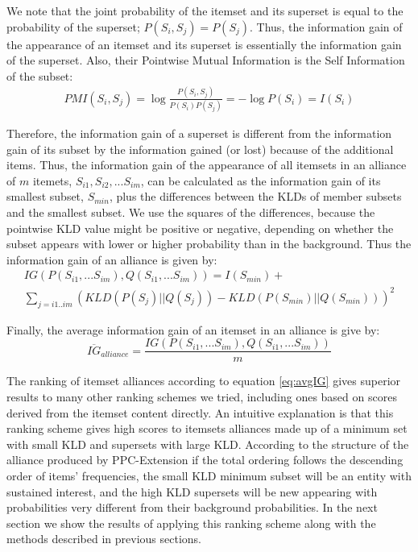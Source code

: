 \documentclass{sig-alternate}
\begin{document}
We note that the joint probability of the itemset and its superset is equal to the probability of the superset; $P(S_i,S_j) = P(S_j)$. Thus, the information gain of the appearance of an itemset and its superset is essentially the information gain of the superset.  Also, their Pointwise Mutual Information is the Self Information of the subset:
\begin{multline}
PMI(S_i, S_j) = \log{ \frac{P(S_i,S_j)}{P(S_i)P(S_j)} } = -\log{P(S_i)} = I(S_i)
\end{multline}

Therefore, the information gain of a superset is different from the information gain of its subset by the information gained (or lost) because of the additional items. Thus, the information gain of the appearance of all itemsets in an alliance of $m$ itemets, $S_{i1},S_{i2},...S_{im}$, can be calculated as the information gain of its smallest subset, $S_{min}$, plus the differences between the KLDs of member subsets and the smallest subset. We use the squares of the differences, because the pointwise KLD value might be positive or negative, depending on whether the subset appears with lower or higher probability than in the background. Thus the information gain of an alliance is given by:
\begin{multline*}IG(P(S_{i1},...S_{im}),Q(S_{i1},...S_{im})) = I(S_{min}) + \\ %
\sum_{j = i1..im}{(KLD(P(S_j)||Q(S_j)) - KLD(P(S_{min})||Q(S_{min})))^{2}} \end{multline*}

Finally, the average information gain of an itemset in an alliance is give by:
\begin{equation}\label{eq:avgIG}\overline{IG}_{alliance} = \frac{IG(P(S_{i1},...S_{im}),Q(S_{i1},...S_{im}))}{m}\end{equation}

The ranking of itemset alliances according to equation \ref{eq:avgIG} gives superior results to many other ranking schemes we tried, including ones based on scores derived from the itemset content directly. An intuitive explanation is that this ranking scheme gives high scores to itemsets alliances made up of a minimum set with small KLD and supersets with large KLD. According to the structure of the alliance produced by PPC-Extension if the total ordering follows the descending order of items' frequencies, the small KLD minimum subset will be an entity with sustained interest, and the high KLD supersets will be new appearing with probabilities very different from their background probabilities. In the next section we show the results of applying this ranking scheme along with the methods described in previous sections.
\end{document}

